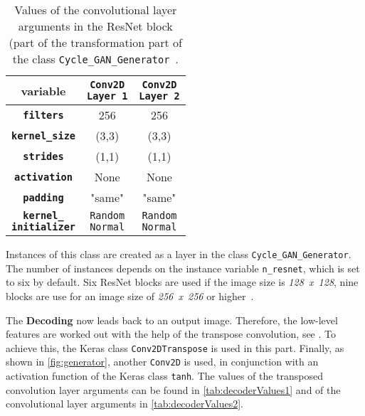 \documentclass[fleqn,10pt]{SelfArx} %
\begin{document}
\begin{table}[htb]
\centering
\caption{Values of the convolutional layer arguments in the \ac{ResNet} block (part of the transformation part of the class \texttt{Cycle\_GAN\-\_Gene\-rator}~\cite{image-to-image-ccan}.}
\label{tab:transformerValues}
\begin{tabular}{c c c}
\textbf{variable} & \makecell[cc]{\textbf{\texttt{Conv2D}} \\ \textbf{\texttt{Layer 1}}} & \makecell[cc]{\textbf{\texttt{Conv2D}} \\ \textbf{\texttt{Layer 2}}} \\ \hline
\textbf{\texttt{filters}} & 256 & 256 \\ \hline
\textbf{\texttt{kernel\_size}} & (3,3) & (3,3) \\ \hline
\textbf{\texttt{strides}} & (1,1) &  (1,1) \\ \hline
\textbf{\texttt{activation}} & None & None \\ \hline 
\textbf{\texttt{padding}} & "same" & "same" \\ \hline
\makecell[cc]{\textbf{\texttt{kernel\_}} \\ \textbf{\texttt{initializer}}} & \makecell[cc]{\texttt{Random} \\ \texttt{Normal}} & \makecell[cc]{\texttt{Random} \\ \texttt{Normal}} \\ \hline
\end{tabular}
\end{table}

Instances of this class are created as a layer in the class \texttt{Cycle\_GAN\-\_Generator}. The number of instances depends on the instance variable \texttt{n\_resnet}, which is set to six by default. Six \ac{ResNet} blocks are used if the image size is \textit{128~x~128}, nine blocks are use for an image size of \textit{256~x~256} or higher~\cite{image-to-image-ccan}.

The \textbf{Decoding} now leads back to an output image. Therefore, the low-level features are worked out with the help of the transpose convolution, see \cite{Introduction-to-Cycle-GANs}. To achieve this, the Keras class \texttt{Conv2DTranspose} is used in this part. Finally, as shown in \autoref{fig:generator}, another \texttt{Conv2D} is used, in conjunction with an activation function of the Keras class \texttt{tanh}. The values of the transposed convolution layer arguments can be found in \autoref{tab:decoderValues1} and of the convolutional layer arguments in \autoref{tab:decoderValues2}.
\end{document}
